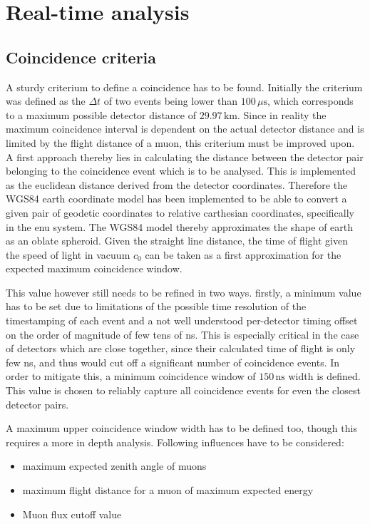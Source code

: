 \documentclass[abstract,toc,los,english,11pt,glossaries]{jluthesis}
\begin{document}
\section{Real-time analysis}
\subsection{Coincidence criteria}
A sturdy criterium to define a coincidence has to be found. Initially the criterium was defined as the $\Delta{t}$ of two events being lower than $100\,\mu\text{s}$, which corresponds to a maximum possible detector distance of $29.97\,\text{km}$. Since in reality the maximum coincidence interval is dependent on the actual detector distance and is limited by the flight distance of a muon, this criterium must be improved upon. A first approach thereby lies in calculating the distance between the detector pair belonging to the coincidence event which is to be analysed. This is implemented as the euclidean distance derived from the detector coordinates. Therefore the WGS84 earth coordinate model has been implemented to be able to convert a given pair of geodetic coordinates to relative carthesian coordinates, specifically in the \acrfull{enu} system. The WGS84 model thereby approximates the shape of earth as an oblate spheroid. Given the straight line distance, the time of flight given the speed of light in vacuum $c_0$ can be taken as a first approximation for the expected maximum coincidence window.

This value however still needs to be refined in two ways. firstly, a minimum value has to be set due to limitations of the possible time resolution of the timestamping of each event and a not well understood per-detector timing offset on the order of magnitude of few tens of ns. This is especially critical in the case of detectors which are close together, since their calculated time of flight is only few ns, and thus would cut off a significant number of coincidence events. In order to mitigate this, a minimum coincidence window of $150\,\text{ns}$ width is defined. This value is chosen to reliably capture all coincidence events for even the closest detector pairs.

A maximum upper coincidence window width has to be defined too, though this requires a more in depth analysis. Following influences have to be considered:
\begin{itemize}
	\item maximum expected zenith angle of muons
	\item maximum flight distance for a muon of maximum expected energy
	\item Muon flux cutoff value
\end{itemize}
\end{document}
